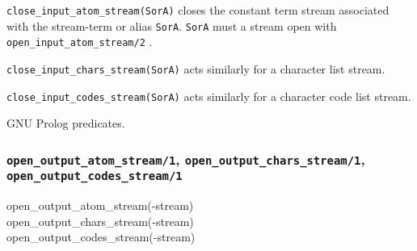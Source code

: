 \Description

\texttt{close\_input\_atom\_stream(SorA)} closes the constant term stream
associated with the stream-term or alias \texttt{SorA}. \texttt{SorA} must a
stream open with \texttt{open\_input\_atom\_stream/2}
.

\texttt{close\_input\_chars\_stream(SorA)} acts similarly for a character
list stream.

\texttt{close\_input\_codes\_stream(SorA)} acts similarly for a character
code list stream.

\begin{PlErrors}






\end{PlErrors}

\Portability

GNU Prolog predicates.

\subsubsection{\texttt{open\_output\_atom\_stream/1}, 
               \texttt{open\_output\_chars\_stream/1}, \\ 
               \texttt{open\_output\_codes\_stream/1}}
\label{open-output-atom-stream/1}

\begin{TemplatesOneCol}
open\_output\_atom\_stream(-stream)\\
open\_output\_chars\_stream(-stream)\\
open\_output\_codes\_stream(-stream)

\end{TemplatesOneCol}

